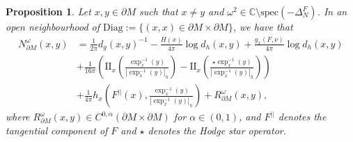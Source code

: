 \documentclass[12pt,a4paper]{amsart}
\numberwithin{equation}{section}
\theoremstyle{plain}
\newtheorem{theorem}{Theorem}[section]
\newtheorem{proposition}[theorem]{Proposition}
\theoremstyle{definition}
\begin{document}

 \begin{proposition}\label{sing_structure_for_N}
		Let $x,y\in \partial M$ such that $x\neq y$ and $\omega^2\in \mathbb{C}\setminus \mathrm{spec}(-\Delta_N^F)$. In an open neighbourhood of $\mathrm{Diag}:=\{(x,x)\in \partial M\times \partial M\}$, we have that
		\begin{align*}
			N^\omega_{\partial M}(x,y) &= \frac{1}{2\pi}d_g(x,y)^{-1} -\frac{H(x)}{4\pi}\log d_h(x,y)+\frac{g_x(F,\nu)}{4\pi}\log d_h(x,y)\\ &+\frac{1}{16\pi}\left(\mathrm{II}_{x}\left(\frac{\exp_{x}^{-1}(y)}{|\exp_{x}^{-1}(y)|_h}\right)-\mathrm{II}_{x}\left(\frac{\star\exp_{x}^{-1}(y)}{|\exp_{x}^{-1}(y)|_h}\right)\right) \\
			& +\frac{1}{4\pi}h_{x}\left(F^{||}(x),\frac{\exp^{-1}_{x}(y)}{|\exp^{-1}_{x}(y)|_h}\right) + R^\omega_{\partial M}(x,y),
		\end{align*}
		where $R^\omega_{\partial M}(x,y) \in C^{0,\alpha}(\partial M\times \partial M)$ for $\alpha\in (0,1)$, and $F^{||}$ denotes the tangential component of $F$ and $\star$ denotes the Hodge star operator. 
	\end{proposition}
\end{document}

